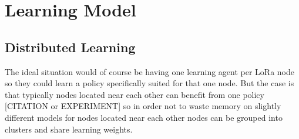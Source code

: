
\chapter{Learning Model}
\section{Distributed Learning}

The ideal situation would of course be having one learning agent 
per LoRa node so they could learn a policy specifically suited for
that one node. But the case is that typically nodes located 
near each other can benefit from one policy [CITATION or EXPERIMENT]
so in order not to waste memory on slightly different models 
for nodes located near each other nodes can be grouped into clusters
and share learning weights.




